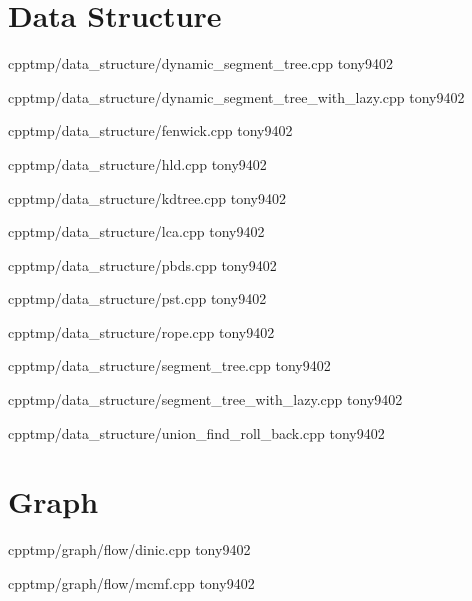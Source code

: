 \section{Data Structure}


{}
{}
{}
{cpp}{tmp/data_structure/dynamic_segment_tree.cpp}
{tony9402}



{}
{}
{}
{cpp}{tmp/data_structure/dynamic_segment_tree_with_lazy.cpp}
{tony9402}



{}
{}
{}
{cpp}{tmp/data_structure/fenwick.cpp}
{tony9402}



{}
{}
{}
{cpp}{tmp/data_structure/hld.cpp}
{tony9402}



{}
{}
{}
{cpp}{tmp/data_structure/kdtree.cpp}
{tony9402}



{}
{}
{}
{cpp}{tmp/data_structure/lca.cpp}
{tony9402}



{}
{}
{}
{cpp}{tmp/data_structure/pbds.cpp}
{tony9402}



{}
{}
{}
{cpp}{tmp/data_structure/pst.cpp}
{tony9402}



{}
{}
{}
{cpp}{tmp/data_structure/rope.cpp}
{tony9402}



{}
{}
{}
{cpp}{tmp/data_structure/segment_tree.cpp}
{tony9402}



{}
{}
{}
{cpp}{tmp/data_structure/segment_tree_with_lazy.cpp}
{tony9402}



{}
{}
{}
{cpp}{tmp/data_structure/union_find_roll_back.cpp}
{tony9402}


\section{Graph}


{}
{}
{}
{cpp}{tmp/graph/flow/dinic.cpp}
{tony9402}



{}
{}
{}
{cpp}{tmp/graph/flow/mcmf.cpp}
{tony9402}



